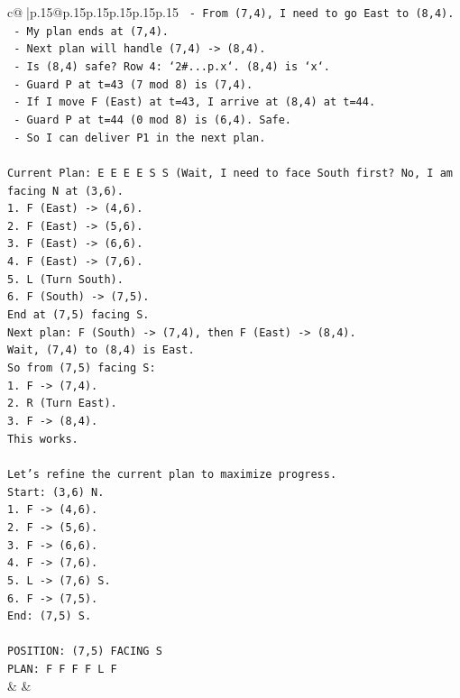 \documentclass{article}
\begin{document}
{\begin{supertabular}{c@{$\;$}|p{.15\linewidth}@{}p{.15\linewidth}p{.15\linewidth}p{.15\linewidth}p{.15\linewidth}p{.15\linewidth}}
{{{\texttt{   {-} From (7,4), I need to go East to (8,4).} \\
\texttt{   {-} My plan ends at (7,4).} \\
\texttt{   {-} Next plan will handle (7,4) {-}> (8,4).} \\
\texttt{   {-} Is (8,4) safe? Row 4: `2\#...p.x`. (8,4) is `x`.} \\
\texttt{   {-} Guard P at t=43 (7 mod 8) is (7,4).} \\
\texttt{   {-} If I move F (East) at t=43, I arrive at (8,4) at t=44.} \\
\texttt{   {-} Guard P at t=44 (0 mod 8) is (6,4). Safe.} \\
\texttt{   {-} So I can deliver P1 in the next plan.} \\
\\ 
\texttt{Current Plan: E E E E S S (Wait, I need to face South first? No, I am facing N at (3,6).} \\
\texttt{1. F (East) {-}> (4,6).} \\
\texttt{2. F (East) {-}> (5,6).} \\
\texttt{3. F (East) {-}> (6,6).} \\
\texttt{4. F (East) {-}> (7,6).} \\
\texttt{5. L (Turn South).} \\
\texttt{6. F (South) {-}> (7,5).} \\
\texttt{End at (7,5) facing S.} \\
\texttt{Next plan: F (South) {-}> (7,4), then F (East) {-}> (8,4).} \\
\texttt{Wait, (7,4) to (8,4) is East.} \\
\texttt{So from (7,5) facing S:} \\
\texttt{1. F {-}> (7,4).} \\
\texttt{2. R (Turn East).} \\
\texttt{3. F {-}> (8,4).} \\
\texttt{This works.} \\
\\ 
\texttt{Let's refine the current plan to maximize progress.} \\
\texttt{Start: (3,6) N.} \\
\texttt{1. F {-}> (4,6).} \\
\texttt{2. F {-}> (5,6).} \\
\texttt{3. F {-}> (6,6).} \\
\texttt{4. F {-}> (7,6).} \\
\texttt{5. L {-}> (7,6) S.} \\
\texttt{6. F {-}> (7,5).} \\
\texttt{End: (7,5) S.} \\
\\ 
\texttt{POSITION: (7,5) FACING S} \\
\texttt{PLAN: F F F F L F} \\
            }
        }
    }
    & & \\ \\


\end{supertabular}}
\end{document}
